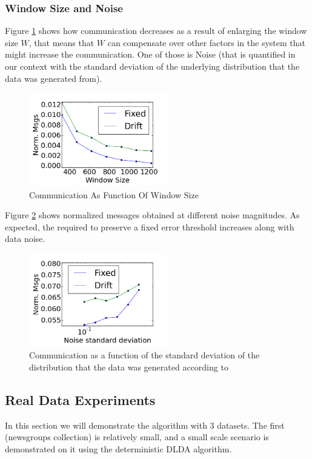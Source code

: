 \documentclass[11pt,twocolumn,varwidth=true,a4paper,fleqn]{article}
\begin{document}
\subsubsection{Window Size and Noise}
Figure \ref{WindowSize} shows how communication decreases as a result
of enlarging the window size $W$, that means that $W$ can compensate over other
factors in the system that might increase the communication. One of those is
Noise (that is quantified in our context with the standard deviation of the
underlying distribution that the data was generated from).
 \begin{figure}[h]
	\centering
	\includegraphics[width=60mm]{CommunicationOfFixedVsDrift/WindowSize.png}
	\caption{Communication As Function Of Window Size}
	\label{WindowSize}
	\end{figure}
Figure \ref{Noise} shows normalized messages obtained at different
noise magnitudes. As expected, the required to preserve a
fixed error threshold increases along with data noise.
\begin{figure}[h]
	\centering
	\includegraphics[width=60mm]{CommunicationOfFixedVsDrift/Noise.png}
	\caption{Communication as a function of the standard deviation of the
	distribution that the data was generated according to}
	\label{Noise}
	\end{figure}

\subsection{Real Data Experiments}
In this section we will demonstrate the algorithm with 3 datasets. The first
(newsgroups collection) is relatively small, and a small scale
scenario is demonstrated on it using the deterministic DLDA algorithm. 
\end{document}
